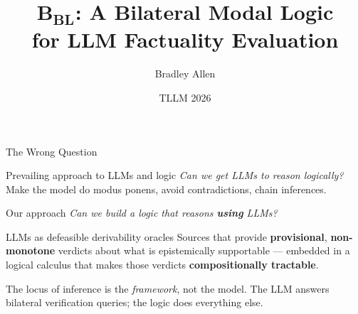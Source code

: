 \documentclass[aspectratio=169,9pt]{beamer}
\title{$\mathbf{B}_{\mathbf{BL}}$: A Bilateral Modal Logic\\[4pt]for LLM Factuality Evaluation}
\author{Bradley Allen}
\institute{University of Amsterdam}
\date{TLLM 2026}
\begin{document}
\begin{frame}
  \titlepage
\end{frame}

\begin{frame}{The Wrong Question}

  \begin{block}{Prevailing approach to LLMs and logic}
    \textit{Can we get LLMs to reason logically?}\\[2pt]
    \small Make the model do modus ponens, avoid contradictions, chain inferences.
  \end{block}

  \bigskip\pause

  \begin{alertblock}{Our approach}
    \textit{Can we build a logic that reasons \textbf{using} LLMs?}
  \end{alertblock}

  \bigskip\pause

  \begin{block}{LLMs as defeasible derivability oracles}
    Sources that provide \textbf{provisional}, \textbf{non-monotone} verdicts about what
    is epistemically supportable — embedded in a logical calculus that makes those
    verdicts \textbf{compositionally tractable}.
  \end{block}

  \bigskip\pause
  \small
  The locus of inference is the \emph{framework}, not the model.
  The LLM answers bilateral verification queries; the logic does everything else.

\end{frame}
\end{document}
